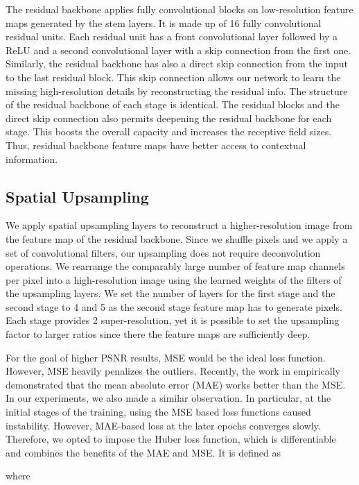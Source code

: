 \documentclass[10pt,twocolumn,letterpaper]{article}
\begin{document}
The residual backbone applies fully convolutional blocks on low-resolution feature maps generated by the stem layers. It is made up of 16 fully convolutional residual units. Each residual unit has a front convolutional layer followed by a ReLU and a second convolutional layer with a skip connection from the first one. Similarly, the residual backbone has also a direct skip connection from the input to the last residual block. This skip connection allows our network to learn the missing high-resolution details by reconstructing the residual info. The structure of the residual backbone of each stage is identical. The residual blocks and the direct skip connection also permits deepening the residual backbone for each stage. This boosts the overall capacity and increases the receptive field sizes. Thus, residual backbone feature maps have better access to contextual information.  

\subsection{Spatial Upsampling}

We apply spatial upsampling layers to reconstruct a higher-resolution image from the feature map of the residual backbone. Since we shuffle pixels and we apply a set of convolutional filters, our upsampling does not require deconvolution operations. We rearrange the comparably large number of feature map channels per pixel into a high-resolution image using the learned weights of the filters of the upsampling layers. We set the number of layers for the first stage and the second stage to 4 and 5 as the second stage feature map has to generate pixels. Each stage provides 2 super-resolution, yet it is possible to set the upsampling factor to larger ratios since there the feature maps are sufficiently deep.  

For the goal of higher PSNR results, MSE would be the ideal loss function. However, MSE heavily penalizes the outliers. Recently, the work in \cite{lim2017enhanced} empirically demonstrated that the mean absolute error (MAE) works better than the MSE. In our experiments, we also made a similar observation. In particular, at the initial stages of the training, using the MSE based loss functions caused instability. However, MAE-based loss at the later epochs converges slowly. Therefore, we opted to impose the Huber loss function, which is differentiable and combines the benefits of the MAE and MSE. It is defined as

where 
\end{document}

